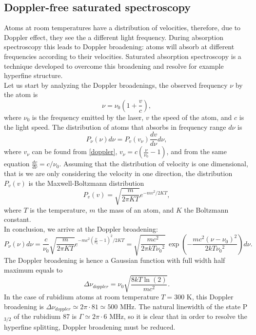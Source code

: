 \documentclass[a4paper,10pt]{article}
\begin{document}
\subsection{Doppler-free saturated spectroscopy}
Atoms at room temperatures have a distribution of velocities, therefore, due to Doppler effect, they see the a different light frequency. During absorption spectroscopy this leads to Doppler broadening: atoms will absorb at different frequencies according to their velocities. Saturated absorption spectroscopy is a technique developed to overcome this broadening and resolve for example hyperfine structure.\\
Let us start by analyzing the Doppler broadenings, the observed frequency $\nu$ by the atom is 
\begin{equation}\label{doppler}\nu = \nu_0\left(1+\frac{v}{c}\right),\end{equation}
where $\nu_0$ is the frequency emitted by the laser, $v$ the speed of the atom, and $c$ is the light speed. The distribution of atoms that absorbs in frequency range $d\nu$ is
\begin{equation}P_{\nu}(\nu)d\nu = P_v(v_\nu)\frac{dv}{d\nu}d\nu,\end{equation}
where $v_\nu$ can be found from \eqref{doppler}, $v_\nu = c\left(\frac{\nu}{\nu_0}-1\right)$, and from the same equation $\frac{dv}{d\nu} = c/\nu_0$.  Assuming that the distribution of velocity is one dimensional, that is we are only considering the velocity in one direction, the distribution $P_v(v)$ is the Maxwell-Boltzmann distribution
\begin{equation}P_v(v) = \sqrt{\frac{m}{2\pi K T}}e^{-mv^2/2KT},\end{equation}
where $T$ is the temperature, $m$ the mass of an atom, and $K$ the Boltzmann constant.\\
In conclusion, we arrive at the Doppler broadening:
\begin{equation}P_{\nu}(\nu)d\nu = \frac{c}{\nu_0}\sqrt{\frac{m}{2\pi K T}}e^{-mc^2\left(\frac{\nu}{\nu_0}-1\right)^2/2KT} =\sqrt{\frac{mc^2}{2\pi kT {\nu_0}^2}}\,\exp\left(-\frac{mc^2\left(\nu-\nu_0\right)^2}{2kT {\nu_0}^2}\right)d\nu. \end{equation}
The Doppler broadening is hence a Gaussian function with full width half maximum equals to
\begin{equation}\Delta \nu_{doppler} = \nu_0\sqrt{\frac{8 k T \ln(2)}{mc^2}}.\end{equation}
In the case of rubidium atoms at room temperature $T=300$ K, this Doppler broadening is \cite{dopplerbroadening} $\Delta \nu_{doppler} \simeq 2\pi\cdot 81 \simeq 500$ MHz. The natural linewidth of the state P$_{3/2}$ of the rubidium 87 is \cite{rubidium87data} $\Gamma \simeq 2\pi \cdot 6$ MHz, so it is clear that in order to resolve the hyperfine splitting, Doppler broadening must be reduced.\\
\end{document}
